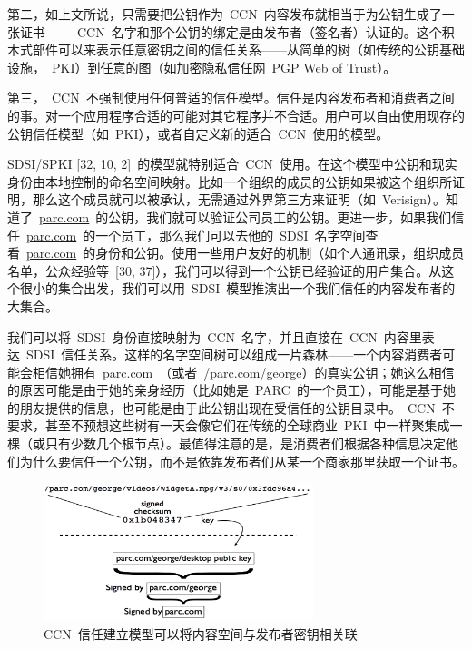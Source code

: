 第二，如上文所说，只需要把公钥作为~CCN~内容发布就相当于为公钥生成了一张证书——~CCN~名字和那个公钥的绑定是由发布者（签名者）认证的。这个积木式部件可以来表示任意密钥之间的信任关系——从简单的树（如传统的公钥基础设施，~PKI）到任意的图（如加密隐私信任网~PGP Web of Trust）。

第三，~CCN~不强制使用任何普适的信任模型。信任是内容发布者和消费者之间的事。对一个应用程序合适的可能对其它程序并不合适。用户可以自由使用现存的公钥信任模型（如~PKI），或者自定义新的适合~CCN~使用的模型。

SDSI/SPKI [32, 10, 2]~的模型就特别适合~CCN~使用。在这个模型中公钥和现实身份由本地控制的命名空间映射。比如一个组织的成员的公钥如果被这个组织所证明，那么这个成员就可以被承认，无需通过外界第三方来证明（如~Verisign）。知道了~\url{parc.com}~的公钥，我们就可以验证公司员工的公钥。更进一步，如果我们信任~\url{parc.com}~的一个员工，那么我们可以去他的~SDSI~名字空间查看~\url{parc.com}~的身份和公钥。使用一些用户友好的机制（如个人通讯录，组织成员名单，公众经验等~[30, 37]），我们可以得到一个公钥已经验证的用户集合。从这个很小的集合出发，我们可以用~SDSI~模型推演出一个我们信任的内容发布者的大集合。

我们可以将~SDSI~身份直接映射为~CCN~名字，并且直接在~CCN~内容里表达~SDSI~信任关系。这样的名字空间树可以组成一片森林——一个内容消费者可能会相信她拥有~\url{parc.com}~（或者~\url{/parc.com/george}）的真实公钥；她这么相信的原因可能是由于她的亲身经历（比如她是~PARC~的一个员工），可能是基于她的朋友提供的信息，也可能是由于此公钥出现在受信任的公钥目录中。~CCN~不要求，甚至不预想这些树有一天会像它们在传统的全球商业~PKI~中一样聚集成一棵（或只有少数几个根节点）。最值得注意的是，是消费者们根据各种信息决定他们为什么要信任一个公钥，而不是依靠发布者们从某一个商家那里获取一个证书。

\begin{figure}[htbp]
\begin{center}
\includegraphics[width=0.7\textwidth]{images/trust}
\caption{CCN~信任建立模型可以将内容空间与发布者密钥相关联}
\label{trust}
\end{center}
\end{figure}

